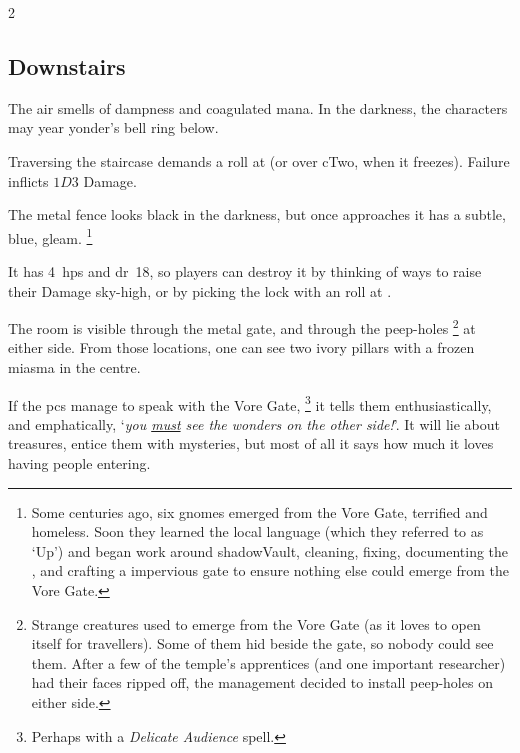 \begin{multicols}{2}
\subsection[Downstairs]{\quad Downstairs\quad{}}

The air smells of dampness and coagulated mana.
In the darkness, the characters may year \gls{yonder}'s bell ring below.


Traversing the staircase demands a  roll at \tn[6] (or \tn[8] over \gls{cTwo}, when it freezes).
Failure inflicts $1D3$ Damage.


\begin{boxtext}
  The metal fence looks black in the darkness, but once  approaches it has a subtle, blue, gleam.%
  \footnote{Some centuries ago, six gnomes emerged from the Vore Gate, terrified and homeless.
  Soon they learned the local language (which they referred to as `Up') and began work around \gls{shadowVault}, cleaning, fixing, documenting the , and crafting a impervious gate to ensure nothing else could emerge from the Vore Gate.}
\end{boxtext}


It has 4~\glspl{hp} and \gls{dr}~18, so players can destroy it by thinking of ways to raise their Damage sky-high, or by picking the lock with an  roll at \tn[16].

\shadowVaultMap


\begin{boxtext}
  The room is visible through the metal gate, and through the peep-holes%
  \footnote{Strange creatures used to emerge from the Vore Gate (as it loves to open itself for travellers).
  Some of them hid beside the gate, so nobody could see them.
  After a few of the \gls{temple}'s apprentices (and one important researcher) had their faces ripped off, the management decided to install peep-holes on either side.}
  at either side.
  From those locations, one can see two ivory pillars with a frozen miasma in the centre.
\end{boxtext}

If the \glspl{pc} manage to speak with the Vore Gate,%
\footnote{Perhaps with a \textit{Delicate Audience} spell.}
it tells them enthusiastically, and emphatically, `\textit{you \underline{must} see the wonders on the other side!}'.
It will lie about treasures, entice them with mysteries, but most of all it says how much it loves having people entering.


\end{multicols}
